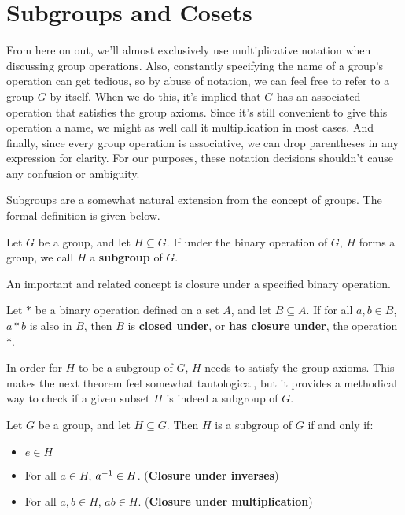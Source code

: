 \section{Subgroups and Cosets}

From here on out, we'll almost exclusively use multiplicative notation when discussing group operations. Also, constantly specifying the name of a group's operation can get tedious, so by abuse of notation, we can feel free to refer to a group $G$ by itself. When we do this, it's implied that $G$ has an associated operation that satisfies the group axioms. Since it's still convenient to give this operation a name, we might as well call it multiplication in most cases. And finally, since every group operation is associative, we can drop parentheses in any expression for clarity. For our purposes, these notation decisions shouldn't cause any confusion or ambiguity.

Subgroups are a somewhat natural extension from the concept of groups. The formal definition is given below.

\begin{definition}
Let $G$ be a group, and let $H \subseteq G$. If under the binary operation of $G$, $H$ forms a group, we call $H$ a \textbf{subgroup} of $G$.
\end{definition}

An important and related concept is closure under a specified binary operation.

\begin{definition}
Let $*$ be a binary operation defined on a set $A$, and let $B \subseteq A$. If for all $a, b \in B$, $a*b$ is also in $B$, then $B$ is \textbf{closed under}, or \textbf{has closure under}, the operation $*$.
\end{definition}

In order for $H$ to be a subgroup of $G$, $H$ needs to satisfy the group axioms. This makes the next theorem feel somewhat tautological, but it provides a methodical way to check if a given subset $H$ is indeed a subgroup of $G$.

\begin{theorem}
\label{subgroup}
Let $G$ be a group, and let $H \subseteq G$. Then $H$ is a subgroup of $G$ if and only if:
\begin{itemize}
    \item $e \in H$
    \item For all $a \in H$, $a^{-1} \in H$. (\textbf{Closure under inverses})
    \item For all $a, b \in H$, $ab \in H$. (\textbf{Closure under multiplication})
\end{itemize}
\end{theorem}

